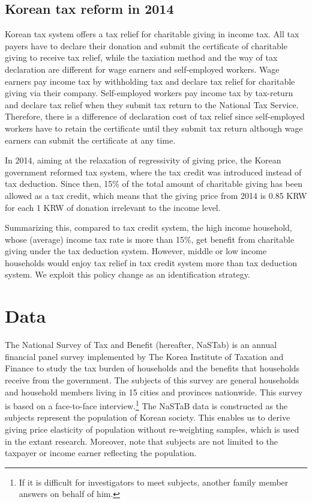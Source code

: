 \documentclass[
  11pt,
  a4paper,
]{article}
\begin{document}
\hypertarget{korean-tax-reform-in-2014}{%
\subsection{Korean tax reform in 2014}\label{korean-tax-reform-in-2014}}

Korean tax system offers a tax relief for charitable giving in income tax. All tax payers have to declare their donation and submit the certificate of charitable giving to receive tax relief, while the taxiation method and the way of tax declaration are different for wage earners and self-employed workers. Wage earners pay income tax by withholding tax and declare tax relief for charitable giving via their company. Self-employed workers pay income tax by tax-return and declare tax relief when they submit tax return to the National Tax Service. Therefore, there is a difference of declaration cost of tax relief since self-employed workers have to retain the certificate until they submit tax return although wage earners can submit the certificate at any time.

In 2014, aiming at the relaxation of regressivity of giving price, the Korean government reformed tax system, where the tax credit was introduced instead of tax deduction. Since then, 15\% of the total amount of charitable giving has been allowed as a tax credit, which means that the giving price from 2014 is 0.85 KRW for each 1 KRW of donation irrelevant to the income level.

Summarizing this, compared to tax credit system, the high income household, whose (average) income tax rate is more than 15\%, get benefit from charitable giving under the tax deduction system. However, middle or low income households would enjoy tax relief in tax credit system more than tax deduction system. We exploit this policy change as an identification strategy.

\hypertarget{data}{%
\section{Data}\label{data}}

The National Survey of Tax and Benefit (hereafter, NaSTab) is an annual financial panel survey
implemented by The Korea Institute of Taxation and Finance
to study the tax burden of households and the benefits that households receive from the government.
The subjects of this survey are general households and household members living in 15 cities and provinces nationwide.
This survey is based on a face-to-face interview.\footnote{If it is difficult for investigators to meet subjects, another family member answers on behalf of him.}
The NaSTaB data is constructed as the subjects represent the population of Korean society.
This enables us to derive giving price elasticity of population without re-weighting samples, which is used in the extant research.
Moreover, note that subjects are not limited to the taxpayer or income earner reflecting the population.
\end{document}
